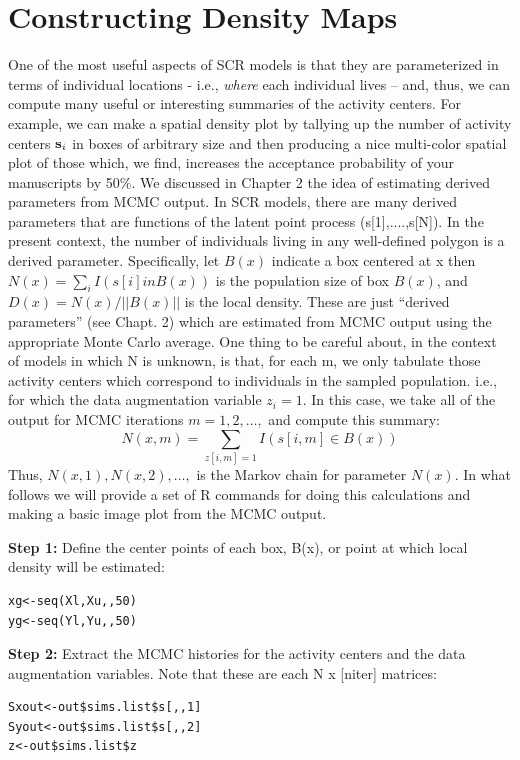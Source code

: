 \section{Constructing Density Maps}
One of the most useful aspects of SCR models is that they are
parameterized in terms of individual locations - i.e., {\it where}
each individual lives -- and, thus, we can compute many useful or interesting summaries of the activity centers.  For example, we can make a spatial density plot by tallying up the number of activity centers ${\bf s}_{i}$ in boxes of arbitrary size and then producing a nice multi-color spatial plot of those which, we find, increases the acceptance probability of your manuscripts by 50\%. 
We discussed in Chapter 2 the idea of estimating derived parameters from MCMC output. In SCR models, there are many derived parameters that are functions of the latent point process (s[1],....,s[N]). In the present context, the number of individuals living in any well-defined polygon is a derived parameter. Specifically, let $B(x)$ indicate a box centered at x then $N(x)=\sum_{i} I(s[i] in B(x))$ is the population size of box $B(x)$, and $D(x) = N(x)/||B(x)||$ is the local density. These are just ``derived parameters'' (see Chapt. 2) which are estimated from MCMC output using the appropriate Monte Carlo average. One thing to be careful about, in the context of models in which N is unknown, is that, for each m, we only tabulate those activity centers which correspond to individuals in the sampled population. i.e., for which the data augmentation variable $z_{i}  = 1$.  In this case, we take all of the output for MCMC iterations $m=1,2,\ldots,$ and compute this summary:
\[
   N(x,m) = \sum_{z[i,m]=1} I(s[i,m] \in B(x))
\]
Thus, $N(x,1),N(x,2),\dots,$ is the Markov chain for parameter $N(x)$.  In what follows we will provide a set of R commands for doing this calculations and making a basic image plot from the MCMC output. 

{\flushleft \bf Step 1:} Define the center points of each box, B(x), or point at which local density will be estimated:
\begin{verbatim}
xg<-seq(Xl,Xu,,50)
yg<-seq(Yl,Yu,,50)
\end{verbatim}

{\flushleft \bf Step 2:} Extract the MCMC histories for the activity centers and the data augmentation variables.  Note that these are each N x [niter] matrices:
\begin{verbatim}
Sxout<-out$sims.list$s[,,1]
Syout<-out$sims.list$s[,,2]
z<-out$sims.list$z
\end{verbatim}

